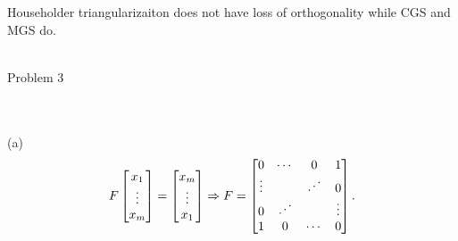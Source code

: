 \documentclass{article}
\begin{document}
Householder triangularizaiton does not have loss of orthogonality while CGS and MGS do.
\\\\\begin{large}Problem 3\end{large}
\\\\(a)\[F\begin{bmatrix}x_1\\\vdots\\x_m\end{bmatrix}=\begin{bmatrix}x_m\\\vdots\\x_1\end{bmatrix}\Rightarrow F=\begin{bmatrix}0&\cdots&0&1\\\vdots&&\reflectbox{$\ddots$}&0\\0&\reflectbox{$\ddots$}&&\vdots\\1&0&\cdots&0\end{bmatrix}.\]
\end{document}
